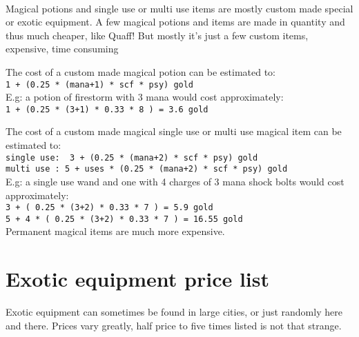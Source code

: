 \

Magical potions and single use or multi use items are mostly custom made special or exotic equipment. A few magical potions and items are made in quantity and thus much cheaper, like Quaff! But mostly it's just a few custom items, expensive, time consuming

The cost of a custom made magical potion can be estimated to:\\
\verb|1 + (0.25 * (mana+1) * scf * psy) gold| \\
E.g: a potion of firestorm with 3 mana would cost approximately:\\
\verb|1 + (0.25 * (3+1) * 0.33 * 8 ) = 3.6 gold|

The cost of a custom made magical single use or multi use magical item can be estimated to: \\
\verb|single use:  3 + (0.25 * (mana+2) * scf * psy) gold| \\
\verb|multi use : 5 + uses * (0.25 * (mana+2) * scf * psy) gold| \\
E.g: a single use wand and one with 4 charges of 3 mana shock bolts would cost approximately: \\
\verb|3 + ( 0.25 * (3+2) * 0.33 * 7 ) = 5.9 gold| \\            %
\verb|5 + 4 * ( 0.25 * (3+2) * 0.33 * 7 ) = 16.55 gold| \\      %

\noindent Permanent magical items are much more expensive.







\goodbreak
{}
\section*{Exotic equipment price list}

Exotic equipment can sometimes be found in large cities, or just randomly here and there. Prices vary greatly, half price to five times listed is not that strange.


